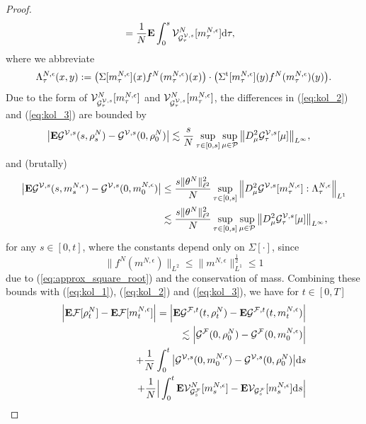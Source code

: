 \begin{proof}
\begin{equation}
\begin{split}
   & = \frac1N \mathbf{E} \int_0^s \mathcal{V}^N_{\mathcal{G}^{\mathcal{V},s}_\tau}[m^{N,\epsilon}_\tau]\mathrm{d}\tau,
    \end{split}
\end{equation}
where we abbreviate 
\[
\Lambda_{\tau}^{N,\epsilon}(x,y) := \big(\Sigma[m_{\tau}^{N,\epsilon}](x)f^N(m_{\tau}^{N,\epsilon})(x)\big)\cdot \big(\Sigma^{\operatorname{t}}[m_{\tau}^{N,\epsilon}](y)f^N(m_{\tau}^{N,\epsilon})(y)\big). 
\]
Due to the form of $\mathcal{V}^N_{\mathcal{G}^{\mathcal{V},s}_\tau}[m^{N,\epsilon}_\tau]$ and $\mathcal{V}^N_{\mathcal{G}^{\mathcal{V},s}_\tau}[m^{N,\epsilon}_\tau]$, the differences in (\ref{eq:kol_2}) and (\ref{eq:kol_3}) are bounded by
\begin{align*}
\big|\mathbf{E}\mathcal{G}^{\mathcal{V},s}(s,\rho_{s}^N) - \mathcal{G}^{\mathcal{V},s}(0,\rho^N_0)\big| & \lesssim \frac{s}{N} \sup_{\tau \in [0,s]}\sup_{\mu \in \mathcal{P}} \big\|D^2_{\mu}\mathcal{G}^{\mathcal{V},s}_{\tau}[\mu]\big\|_{L^{\infty}},
\end{align*}
and (brutally)
\begin{align*}
\big|\mathbf{E}\mathcal{G}^{\mathcal{V},s}(s,m_s^{N,\epsilon}) - \mathcal{G}^{\mathcal{V},s}(0,m_0^{N,\epsilon})\big| & \leq \frac{s\|\theta^N\|^2_{\ell^2}}{N} \sup_{\tau \in [0,s]}\Big \|D^2_{\mu}\mathcal{G}^{\mathcal{V},s}[m_{\tau}^{N,\epsilon}] : \Lambda^{N,\epsilon}_{\tau} \Big\|_{L^1}\\
& \lesssim \frac{s\|\theta^N\|^2_{\ell^2}}{N}\sup_{\tau \in [0,s]}\sup_{\mu \in \mathcal{P}} \big\|D^2_{\mu}\mathcal{G}_{\tau}^{\mathcal{V},s}[\mu]\big\|_{L^{\infty}}, 
\end{align*}
for any $s \in [0,t]$, where the constants depend only on $\Sigma[\cdot]$, since 
\[
\|f^N(m^{N,\epsilon})\|_{L^2} \leq \|m^{N,\epsilon}\|^{\frac{1}{2}}_{L^1} \leq 1
\]
due to (\ref{eq:approx_square_root}) and the conservation of mass. Combining these bounds with (\ref{eq:kol_1}), (\ref{eq:kol_2}) and (\ref{eq:kol_3}), we have for $t  \in [0,T]$ 
\begin{equation}\label{eq:split_weak_error}
\begin{split}
    \Big|\mathbf{E}\mcl{F}[\rho^N_t] - \mathbf{E}\mcl{F}[m_t^{N,\epsilon}]\Big| = \Big|\mathbf{E}\mcl{G}^{\mcl{F},t}(t,\rho^N_t) - \mathbf{E}\mcl{G}^{\mcl{F},t}(t,m_t^{N,\epsilon})\Big|\\
    \lesssim \Big|\mcl{G}^{\mcl{F}}(0,\rho^N_0) - \mcl{G}^{\mcl{F}}(0,m_0^{N,\epsilon})\Big|\\
    + \frac{1}{N}\int_0^t \big|\mcl{G}^{\mcl{V},s}(0,m_0^{N,\epsilon}) - \mcl{G}^{\mcl{V},s}(0,\rho^N_0)\big| \mathrm{d}s\\
    + \frac{1}{N}\Big|\int_0^t \mathbf{E}\mcl{V}^N_{\mcl{G}_s^{\mcl{F}}}[m_s^{N,\epsilon}] - \mathbf{E}\mcl{V}_{\mcl{G}_s^{\mcl{F}}}[m_s^{N,\epsilon}]\mathrm{d}s\Big|\\

\end{split}
\end{equation}
\end{proof}
